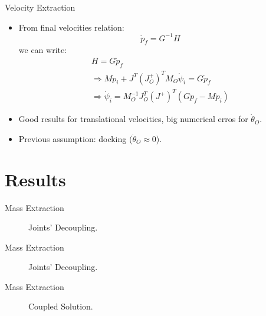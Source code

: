 \begin{frame}{Velocity Extraction}
  \begin{itemize}
    \item From final velocities relation:
    \begin{equation}
      \dot{p}_f=G^{-1}H
    \end{equation}
    we can write:
    \begin{equation}
      \begin{array}{l}
        H=G\dot{p}_f\\
        \Rightarrow M\dot{p}_i+J^T(J_O^+)^TM_O\dot{\psi}_i=G\dot{p}_f\\
        \Rightarrow \dot{\psi}_i=M_O^{-1}J_O^T(J^+)^T(G\dot{p}_f-M\dot{p}_i)
      \end{array}
    \end{equation}
    \item Good results for translational velocities, big numerical erros for $\dot{\theta}_O$.
    \item Previous assumption: docking ($\dot{\theta}_O\approx 0$).
  \end{itemize}
\end{frame}

\section{Results}

\begin{frame}{Mass Extraction}
  \begin{figure}
    \centering
    \subfloat[]{} \quad
    \subfloat[]{}
    \caption{Joints' Decoupling.}
  \end{figure}
\end{frame}

\begin{frame}{Mass Extraction}
  \begin{figure}
    \centering
    \subfloat[]{} \quad
    \subfloat[]{}
    \caption{Joints' Decoupling.}
  \end{figure}
\end{frame}

\begin{frame}{Mass Extraction}
  \begin{figure}
    \centering
    \subfloat[]{} \quad
    \subfloat[]{}
    \caption{Coupled Solution.}
  \end{figure}
\end{frame}

